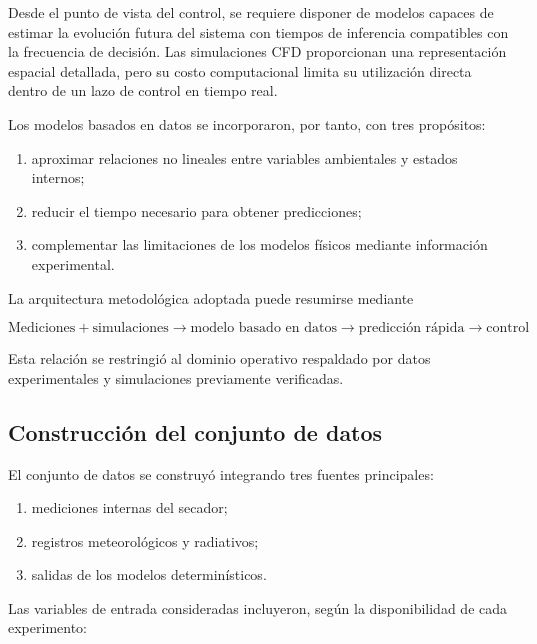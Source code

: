 Desde el punto de vista del control, se requiere disponer de modelos capaces de estimar la evolución futura del sistema con tiempos de inferencia compatibles con la frecuencia de decisión. Las simulaciones CFD proporcionan una representación espacial detallada, pero su costo computacional limita su utilización directa dentro de un lazo de control en tiempo real.

Los modelos basados en datos se incorporaron, por tanto, con tres propósitos:

\begin{enumerate}
    \item aproximar relaciones no lineales entre variables ambientales y estados internos;
    \item reducir el tiempo necesario para obtener predicciones;
    \item complementar las limitaciones de los modelos físicos mediante información experimental.
\end{enumerate}

La arquitectura metodológica adoptada puede resumirse mediante

\begin{equation}
\boxed{
\text{Mediciones}
+
\text{simulaciones}
\longrightarrow
\text{modelo basado en datos}
\longrightarrow
\text{predicción rápida}
\longrightarrow
\text{control}
}
\label{eq:arquitectura_data_driven}
\end{equation}

Esta relación se restringió al dominio operativo respaldado por datos experimentales y simulaciones previamente verificadas.

\subsection{Construcción del conjunto de datos}
\label{subsec:construccion_dataset}

El conjunto de datos se construyó integrando tres fuentes principales:

\begin{enumerate}
    \item mediciones internas del secador;
    \item registros meteorológicos y radiativos;
    \item salidas de los modelos determinísticos.
\end{enumerate}

Las variables de entrada consideradas incluyeron, según la disponibilidad de cada experimento:


